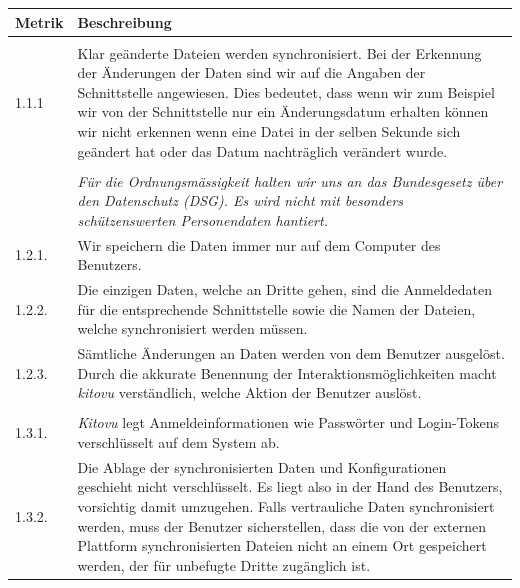 \documentclass[a4paper]{article}
\begin{document}
\begin{tabulary}{\linewidth}{lL}
  \toprule
  Metrik & Beschreibung \\
  \midrule

   \\
  1.1.1 & Klar geänderte Dateien werden synchronisiert. Bei der Erkennung der Änderungen der Daten sind wir auf die Angaben der Schnittstelle angewiesen. Dies bedeutet, dass wenn wir zum Beispiel wir von der Schnittstelle nur ein Änderungsdatum erhalten können wir nicht erkennen wenn eine Datei in der selben Sekunde sich geändert hat oder das Datum nachträglich verändert wurde. \\

   \\
  & \emph{Für die Ordnungsmässigkeit halten wir uns an das Bundesgesetz über den Datenschutz (DSG\footnotemark). Es wird nicht mit besonders schützenswerten Personendaten hantiert.} \\
  1.2.1. & Wir speichern die Daten immer nur auf dem Computer des Benutzers. \\
  1.2.2. & Die einzigen Daten, welche an Dritte gehen, sind die Anmeldedaten für die entsprechende Schnittstelle sowie die Namen der Dateien, welche synchronisiert werden müssen. \\
  1.2.3. & Sämtliche Änderungen an Daten werden von dem Benutzer ausgelöst. Durch die akkurate Benennung der Interaktionsmöglichkeiten macht \emph{kitovu} verständlich, welche Aktion der Benutzer auslöst. \\

   \\
  1.3.1. & \emph{Kitovu} legt Anmeldeinformationen wie Passwörter und Login-Tokens verschlüsselt auf dem System ab. \\
  1.3.2. & Die Ablage der synchronisierten Daten und Konfigurationen geschieht nicht verschlüsselt. Es liegt also in der Hand des Benutzers, vorsichtig damit umzugehen. \newline Falls vertrauliche Daten synchronisiert werden, muss der Benutzer sicherstellen, dass die von der externen Plattform synchronisierten Dateien nicht an einem Ort gespeichert werden, der für unbefugte Dritte zugänglich ist. \\
  \bottomrule
\end{tabulary}

\end{document}
